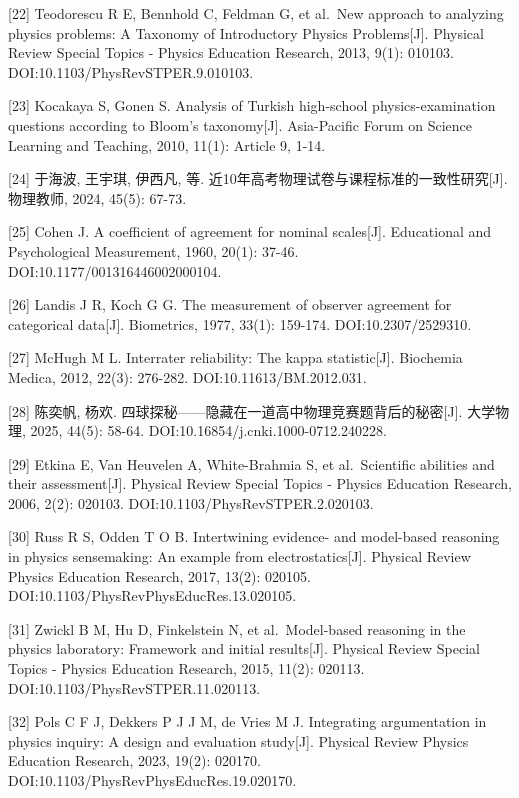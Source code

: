 \documentclass[
  12pt,
  a4paper,twoside,openany]{ctexbook}
\begin{document}
{[}22{]} Teodorescu R E, Bennhold C, Feldman G, et al.~New approach to
analyzing physics problems: A Taxonomy of Introductory Physics
Problems{[}J{]}. Physical Review Special Topics - Physics Education
Research, 2013, 9(1): 010103. DOI:10.1103/PhysRevSTPER.9.010103.

{[}23{]} Kocakaya S, Gonen S. Analysis of Turkish high-school
physics-examination questions according to Bloom's taxonomy{[}J{]}.
Asia-Pacific Forum on Science Learning and Teaching, 2010, 11(1):
Article 9, 1-14.

{[}24{]} 于海波, 王宇琪, 伊西凡, 等.
近10年高考物理试卷与课程标准的一致性研究{[}J{]}. 物理教师, 2024, 45(5):
67-73.

{[}25{]} Cohen J. A coefficient of agreement for nominal scales{[}J{]}.
Educational and Psychological Measurement, 1960, 20(1): 37-46.
DOI:10.1177/001316446002000104.

{[}26{]} Landis J R, Koch G G. The measurement of observer agreement for
categorical data{[}J{]}. Biometrics, 1977, 33(1): 159-174.
DOI:10.2307/2529310.

{[}27{]} McHugh M L. Interrater reliability: The kappa statistic{[}J{]}.
Biochemia Medica, 2012, 22(3): 276-282. DOI:10.11613/BM.2012.031.

{[}28{]} 陈奕帆, 杨欢.
四球探秘------隐藏在一道高中物理竞赛题背后的秘密{[}J{]}. 大学物理, 2025,
44(5): 58-64. DOI:10.16854/j.cnki.1000-0712.240228.

{[}29{]} Etkina E, Van Heuvelen A, White-Brahmia S, et al.~Scientific
abilities and their assessment{[}J{]}. Physical Review Special Topics -
Physics Education Research, 2006, 2(2): 020103.
DOI:10.1103/PhysRevSTPER.2.020103.

{[}30{]} Russ R S, Odden T O B. Intertwining evidence- and model-based
reasoning in physics sensemaking: An example from electrostatics{[}J{]}.
Physical Review Physics Education Research, 2017, 13(2): 020105.
DOI:10.1103/PhysRevPhysEducRes.13.020105.

{[}31{]} Zwickl B M, Hu D, Finkelstein N, et al.~Model-based reasoning
in the physics laboratory: Framework and initial results{[}J{]}.
Physical Review Special Topics - Physics Education Research, 2015,
11(2): 020113. DOI:10.1103/PhysRevSTPER.11.020113.

{[}32{]} Pols C F J, Dekkers P J J M, de Vries M J. Integrating
argumentation in physics inquiry: A design and evaluation study{[}J{]}.
Physical Review Physics Education Research, 2023, 19(2): 020170.
DOI:10.1103/PhysRevPhysEducRes.19.020170.
\end{document}
